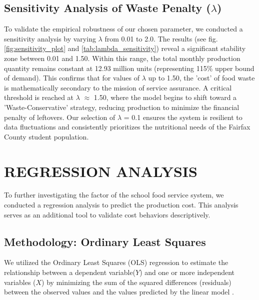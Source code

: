 \documentclass[journal]{IEEEtran}
\begin{document}
\subsection{Sensitivity Analysis of Waste Penalty ($\lambda$)}
To validate the empirical robustness of our chosen parameter, we conducted a sensitivity analysis by varying $\lambda$ from 0.01 to 2.0. The results (see fig. \ref{fig:sensitivity_plot} and \autoref{tab:lambda_sensitivity}) reveal a significant stability zone between 0.01 and 1.50. Within this range, the total monthly production quantity remains constant at 12.93 million units (representing 115\% upper bound of demand). This confirms that for values of $\lambda$ up to 1.50, the 'cost' of food waste is mathematically secondary to the mission of service assurance. A critical threshold is reached at $\lambda$ $\approx$ 1.50, where the model begins to shift toward a 'Waste-Conservative' strategy, reducing production to minimize the financial penalty of leftovers. Our selection of $\lambda$ = 0.1 ensures the system is resilient to data fluctuations and consistently prioritizes the nutritional needs of the Fairfax County student population.


\section{REGRESSION ANALYSIS}

To further investigating the factor of the school food service system, we conducted a regression analysis to predict the production cost. This analysis serves as an additional tool to validate cost behaviors descriptively.

\subsection{Methodology: Ordinary Least Squares}

We utilized the Ordinary Least Squares (OLS) regression to estimate the relationship between a dependent variable($Y$) and one or more independent variables ($X$) by minimizing the sum of the squared differences (residuals) between the observed values and the values predicted by the linear model \cite{Wooditch2021}.
\end{document}
